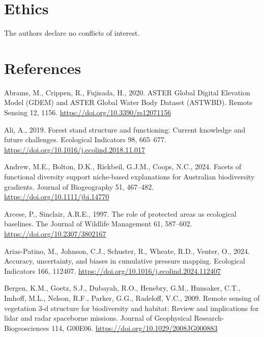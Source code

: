 \documentclass[
]{agujournal2019}
\newlength{\cslhangindent}
\newenvironment{CSLReferences}[2] %
 {\begin{list}{}{%
  \setlength{\itemindent}{0pt}
  \setlength{\leftmargin}{0pt}
  \setlength{\parsep}{0pt}
  \ifodd #1
   \setlength{\leftmargin}{\cslhangindent}
   \setlength{\itemindent}{-1\cslhangindent}
  \fi
  \setlength{\itemsep}{#2\baselineskip}}}
 {\end{list}}
\begin{document}
\section{Ethics}\label{ethics}

The authors declare no conflicts of interest.

\newpage

\section*{References}\label{references}

\label{refs}
\begin{CSLReferences}{1}{0}
\vspace{1em}

Abrams, M., Crippen, R., Fujisada, H., 2020. ASTER Global Digital
Elevation Model (GDEM) and ASTER Global Water Body Dataset (ASTWBD).
Remote Sensing 12, 1156. \url{https://doi.org/10.3390/rs12071156}

Ali, A., 2019. Forest stand structure and functioning: Current knowledge
and future challenges. Ecological Indicators 98, 665--677.
\url{https://doi.org/10.1016/j.ecolind.2018.11.017}

Andrew, M.E., Bolton, D.K., Rickbeil, G.J.M., Coops, N.C., 2024. Facets
of functional diversity support niche-based explanations for Australian
biodiversity gradients. Journal of Biogeography 51, 467--482.
\url{https://doi.org/10.1111/jbi.14770}

Arcese, P., Sinclair, A.R.E., 1997. The role of protected areas as
ecological baselines. The Journal of Wildlife Management 61, 587--602.
\url{https://doi.org/10.2307/3802167}

Arias-Patino, M., Johnson, C.J., Schuster, R., Wheate, R.D., Venter, O.,
2024. Accuracy, uncertainty, and biases in cumulative pressure mapping.
Ecological Indicators 166, 112407.
\url{https://doi.org/10.1016/j.ecolind.2024.112407}

Bergen, K.M., Goetz, S.J., Dubayah, R.O., Henebry, G.M., Hunsaker, C.T.,
Imhoff, M.L., Nelson, R.F., Parker, G.G., Radeloff, V.C., 2009. Remote
sensing of vegetation 3-d structure for biodiversity and habitat: Review
and implications for lidar and radar spaceborne missions. Journal of
Geophysical Research-Biogeosciences 114, G00E06.
\url{https://doi.org/10.1029/2008JG000883}


\end{CSLReferences}
\end{document}

